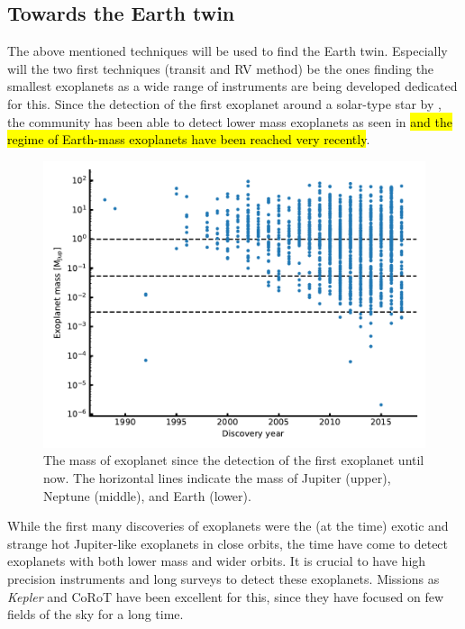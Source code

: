 \subsection{Towards the Earth twin}

The above mentioned techniques will be used to find the Earth twin. Especially will the two first
techniques (transit and RV method) be the ones finding the smallest exoplanets as a wide range of
instruments are being developed dedicated for this. Since the detection of the first exoplanet around a solar-type star by \citet{Mayor1995}, the
community has been able to detect lower mass exoplanets as seen in  \hl{and
the regime of Earth-mass exoplanets have been reached very recently}.

\begin{figure}[htpb!]
    \centering
    \includegraphics[width=0.8\linewidth]{figures/exoplanetMass.pdf}
    \caption{The mass of exoplanet since the detection of the first exoplanet until now. The
             horizontal lines indicate the mass of Jupiter (upper), Neptune (middle), and Earth
             (lower).}
    \label{fig:exoplanetMass}
\end{figure}

While the first many discoveries of exoplanets were the (at the time) exotic and strange hot
Jupiter-like exoplanets in close orbits, the time have come to detect exoplanets with both lower
mass and wider orbits. It is crucial to have high precision instruments and long surveys to detect
these exoplanets. Missions as \emph{Kepler} and CoRoT have been excellent for this, since they have
focused on few fields of the sky for a long time.

